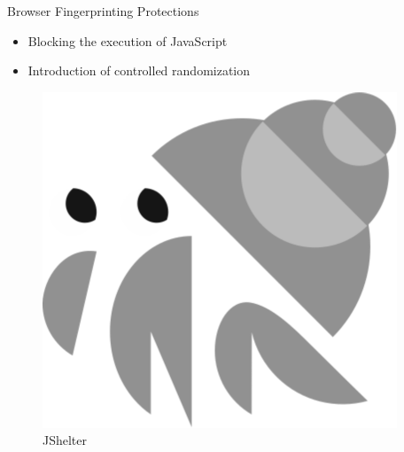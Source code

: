 \documentclass[aspectratio=169]{beamer}
[aspectratio=169] %
\begin{document}
\begin{frame}{Browser Fingerprinting Protections}
  \begin{minipage}{0.49\textwidth} 
    \begin{itemize}
      \item Blocking the execution of JavaScript
      \pause
      \item Introduction of controlled randomization
    \end{itemize}
  \end{minipage}
  \hfill
  \begin{minipage}{0.49\textwidth} 
    \begin{figure}
      \centering
      \includegraphics[height=0.5\textheight]{figures/jshelter.png}
      \caption{JShelter}
    \end{figure}
  \end{minipage}
\end{frame}
\end{document}
